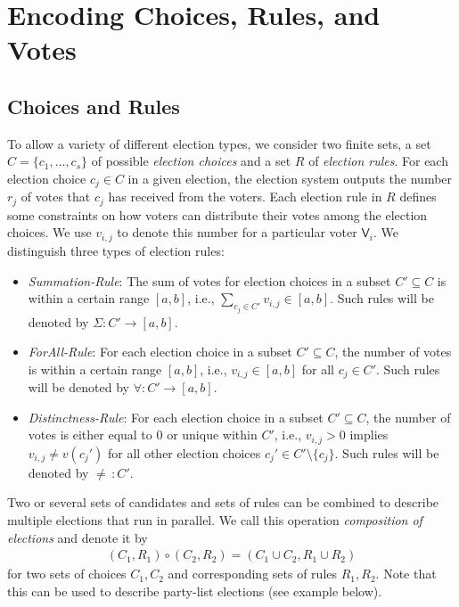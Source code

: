 \documentclass[bibtotoc,halfparskip,oneside]{scrreprt}
\newcommand{\Voter}[1]{\ensuremath{\mathsf{V}_{#1}}\xspace}
\begin{document}
	\section{Encoding Choices, Rules, and Votes}
	
	\subsection{Choices and Rules}\label{choices}
	
	To allow a variety of different election types, we consider two finite sets, a set $C=\{c_1,\ldots,c_s\}$ of possible \emph{election choices} and a set $R$ of \emph{election rules}. For each election choice $c_j\in C$ in a given election, the election system outputs the number $r_j$ of votes that $c_j$ has received from the voters. Each election rule in $R$ defines some constraints on how voters can distribute their votes among the election choices. We use $v_{i,j}$ to denote this number for a particular voter $\Voter{i}$. We distinguish three types of election rules:
	\begin{itemize}
		\item \emph{Summation-Rule}: The sum of votes for election choices in a subset $C'\subseteq C$ is within a certain range $[a,b]$, i.e., $\sum\limits_{c_j\in C'}v_{i,j}\in [a,b]$. Such rules will be denoted by $\Sigma:C'\rightarrow[a,b]$.
		\item \emph{ForAll-Rule}: For each election choice in a subset $C'\subseteq C$, the number of votes is within a certain range $[a,b]$, i.e., $v_{i,j}\in [a,b]$ for all $c_j\in C'$. Such rules will be denoted by $\forall:C'\rightarrow[a,b]$. 
		\item \emph{Distinctness-Rule}: For each election choice in a subset $C'\subseteq C$, the number of votes is either equal to $0$ or unique within $C'$, i.e., $v_{i,j}>0$ implies $v_{i,j}\not= v(c_j')$ for all other election choices $c_j'\in C'\setminus\{c_j\}$. Such rules will be denoted by $\not=\,:C'$.
	\end{itemize}
	Two or several sets of candidates and sets of rules can be combined to describe multiple elections that run in parallel. We call this operation \emph{composition of elections} and denote it by
	\begin{align*}
		(C_1,R_1) \circ (C_2,R_2) = (C_1\cup C_2, R_1 \cup R_2)
	\end{align*}
	for two sets of choices $C_1,C_2$ and corresponding sets of rules $R_1,R_2$. Note that this can be used to describe party-list elections (see example below).
	
\end{document}

